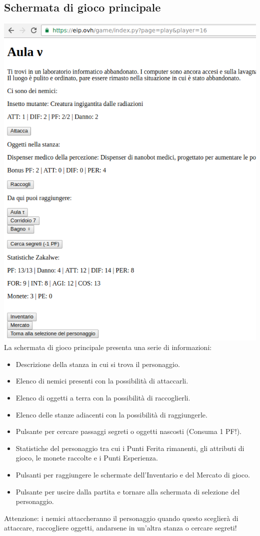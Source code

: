 \documentclass[10pt,a4paper]{article}
\begin{document}
\subsection{Schermata di gioco principale}
\includegraphics[scale=0.6]{5schermatadigioco}\\
La schermata di gioco principale presenta una serie di informazioni:
\begin{itemize}
\item Descrizione della stanza in cui si trova il personaggio.
\item Elenco di nemici presenti con la possibilità di attaccarli.
\item Elenco di oggetti a terra con la possibilità di raccoglierli.
\item Elenco delle stanze adiacenti con la possibilità di raggiungerle.
\item Pulsante per cercare passaggi segreti o oggetti nascosti (Consuma 1 PF!).
\item Statistiche del personaggio tra cui i Punti Ferita rimanenti, gli attributi di gioco, le monete raccolte e i Punti Esperienza.
\item Pulsanti per raggiungere le schermate dell'Inventario e del Mercato di gioco.
\item Pulsante per uscire dalla partita e tornare alla schermata di selezione del personaggio.
\end{itemize}
Attenzione: i nemici attaccheranno il personaggio quando questo sceglierà di attaccare, raccogliere oggetti, andarsene in un'altra stanza o cercare segreti!
\end{document}

